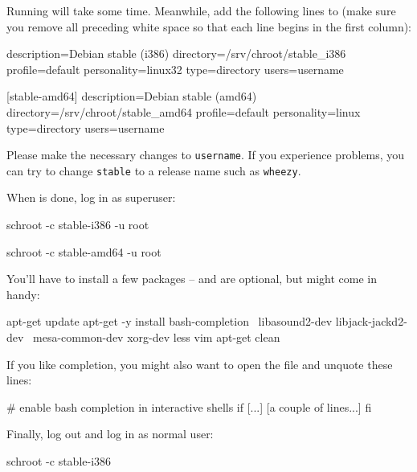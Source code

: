 Running  will take some time.  Meanwhile, add the
following lines to  (make sure you
remove all preceding white space so that each line begins in the first
column):

\begin{VerbatimBoth}
  [stable-i386]
  description=Debian stable (i386)
  directory=/srv/chroot/stable_i386
  profile=default
  personality=linux32
  type=directory
  users=username

  [stable-amd64]
  description=Debian stable (amd64)
  directory=/srv/chroot/stable_amd64
  profile=default
  personality=linux
  type=directory
  users=username
\end{VerbatimBoth}

Please make the necessary changes to \texttt{username}.  If you
experience problems, you can try to change \texttt{stable} to a
release name such as \texttt{wheezy}.

When  is done, log in as superuser:

\begin{Verbatim32}
  schroot -c stable-i386 -u root
\end{Verbatim32}

\begin{Verbatim64}
  schroot -c stable-amd64 -u root
\end{Verbatim64}

You'll have to install a few packages --  and 
are optional, but might come in handy:

\begin{VerbatimBoth}
  apt-get update
  apt-get -y install bash-completion \
    libasound2-dev libjack-jackd2-dev \
    mesa-common-dev xorg-dev less vim
  apt-get clean
\end{VerbatimBoth}

If you like  completion, you might also want to open the
file  and unquote these lines:

\begin{VerbatimBoth}
  # enable bash completion in interactive shells
  if [...]
    [a couple of lines...]
  fi
\end{VerbatimBoth}

Finally, log out and log in as normal user:

\begin{Verbatim32}
  schroot -c stable-i386
\end{Verbatim32}

